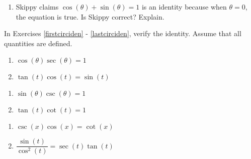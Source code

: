 \documentclass{ximera}
\begin{document}
\begin{enumerate}
\setcounter{enumi}{\value{HW}}

\item Skippy claims  $\cos(\theta) + \sin(\theta) = 1$ is an identity because when $\theta = 0$, the equation is true.  Is Skippy correct? Explain.

\setcounter{HW}{\value{enumi}}
\end{enumerate}

\pagebreak

In Exercises \ref{firstcirciden} - \ref{lastcirciden}, verify the identity.  Assume that all quantities are defined.

\begin{multicols}{2}

\begin{enumerate}

\setcounter{enumi}{\value{HW}}

\item $\cos(\theta) \sec(\theta) = 1$ \label{firstcirciden}
\item $\tan(t)\cos(t) = \sin(t)$

\setcounter{HW}{\value{enumi}}

\end{enumerate}

\end{multicols}

\begin{multicols}{2}

\begin{enumerate}

\setcounter{enumi}{\value{HW}}

\item $\sin(\theta) \csc(\theta) = 1$
\item $\tan(t) \cot(t) = 1$

\setcounter{HW}{\value{enumi}}

\end{enumerate}

\end{multicols}

\begin{multicols}{2}

\begin{enumerate}

\setcounter{enumi}{\value{HW}}

\item $\csc(x) \cos(x) = \cot(x)$ 
\item $\dfrac{\sin(t)}{\cos^{2}(t)} = \sec(t) \tan(t)$

\setcounter{HW}{\value{enumi}}

\end{enumerate}

\end{multicols}
\end{document}
